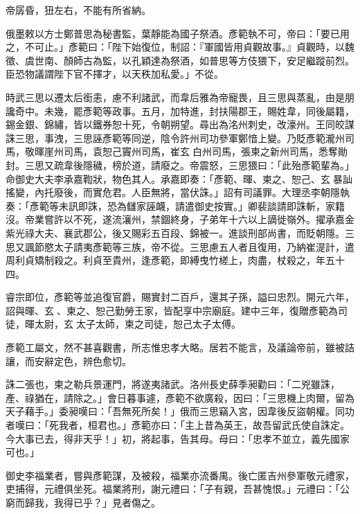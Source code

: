 \begin{pinyinscope}
 帝孱昏，狃左右，不能有所省納。



 俄墨敕以方士鄭普思為秘書監，葉靜能為國子祭酒。彥範執不可，帝曰：「要已用之，不可止。」彥範曰：「陛下始復位，制詔：『軍國皆用貞觀故事。』貞觀時，以魏徵、虞世南、顏師古為監，以孔穎達為祭酒，如普思等方伎猥下，安足繼蹤前烈。臣恐物議謂陛下官不擇才，以天秩加私愛。」不從。



 時武三思以遷太后銜恚，慮不利諸武，而韋后雅為帝寵畏，且三思與蒸亂，由是朋讒奇中。未幾，罷彥範等政事。五月，加特進，封扶陽郡王，賜姓韋，同後屬籍，錫金銀、錦繡，皆以鐵券恕十死，令朝朔望。尋出為洺州刺史，改濠州。王同皎謀誅三思，事洩，三思誣彥範等同逆，陰令許州司功參軍鄭愔上變。乃貶彥範瀧州司馬，敬暉崖州司馬，袁恕己竇州司馬，崔玄白州司馬，張柬之新州司馬，悉奪勛封。三思又疏韋後隱穢，榜於道，請廢之。帝震怒，三思猥曰：「此殆彥範輩為。」命御史大夫李承嘉鞫狀，物色其人。承嘉即奏：「彥範、暉、柬之、恕己、玄暴訕搖變，內托廢後，而實危君。人臣無將，當伏誅。」詔有司議罪。大理丞李朝隱執奏：「彥範等未訊即誅，恐為讎家誣衊，請遣御史按實。」卿裴談請即誅斬，家籍沒。帝業嘗許以不死，遂流瀼州，禁錮終身，子弟年十六以上謫徙嶺外。擢承嘉金紫光祿大夫、襄武郡公，後又賜彩五百段、錦被一。進談刑部尚書，而貶朝隱。三思又諷節愍太子請夷彥範等三族，帝不從。三思慮五人者且復用，乃納崔湜計，遣周利貞矯制殺之。利貞至貴州，逢彥範，即縛曳竹槎上，肉盡，杖殺之，年五十四。



 睿宗即位，彥範等並追復官爵，賜實封二百戶，還其子孫，謚曰忠烈。開元六年，詔與暉、玄、柬之、恕己勤勞王家，皆配享中宗廟庭。建中三年，復贈彥範為司徒，暉太尉，玄太子太師，柬之司徒，恕己太子太傅。



 彥範工屬文，然不甚喜觀書，所志惟忠孝大略。居若不能言，及議論帝前，雖被詰讓，而安辭定色，辨色愈切。



 誅二張也，柬之勒兵景運門，將遂夷諸武。洛州長史薛季昶勸曰：「二兇雖誅，產、祿猶在，請除之。」會日暮事遽，彥範不欲廣殺，因曰：「三思機上肉爾，留為天子藉手。」委昶嘆曰：「吾無死所矣！」俄而三思竊入宮，因韋後反盜朝權。同功者嘆曰：「死我者，桓君也。」彥範亦曰：「主上昔為英王，故吾留武氏使自誅定。今大事已去，得非天乎！」初，將起事，告其母。母曰：「忠孝不並立，義先國家可也。」



 御史李福業者，嘗與彥範謀，及被殺，福業亦流番禺。後亡匿吉州參軍敬元禮家，吏捕得，元禮俱坐死。福業將刑，謝元禮曰：「子有親，吾甚愧恨。」元禮曰：「公窮而歸我，我得已乎？」見者傷之。




\end{pinyinscope}
